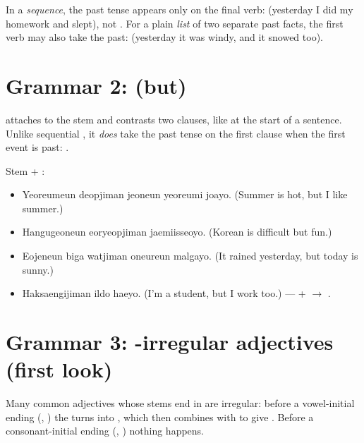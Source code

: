 \begin{important}
In a \emph{sequence}, the past tense appears only on the final verb:  (yesterday I did my homework and slept), not . For a plain
\emph{list} of two separate past facts, the first verb may also take the past:
 (yesterday it was windy, and it snowed too).
\end{important}

\section{Grammar 2:  (but)}

 attaches to the stem and contrasts two clauses, like  at the
start of a sentence. Unlike sequential , it \emph{does} take the past tense
on the first clause when the first event is past: .

\begin{example}[Contrast]
Stem + :
\begin{itemize}
  \item {} Yeoreumeun deopjiman jeoneun yeoreumi
        joayo. (Summer is hot, but I like summer.)
  \item {} Hangugeoneun eoryeopjiman jaemiisseoyo. (Korean
        is difficult but fun.)
  \item {} Eojeneun biga watjiman oneureun malgayo.
        (It rained yesterday, but today is sunny.)
  \item {} Haksaengijiman ildo haeyo. (I'm a student, but I
        work too.) ---  +  $\to$ .
\end{itemize}
\end{example}

\section{Grammar 3: -irregular adjectives (first look)}

Many common adjectives whose stems end in  are irregular: before a vowel-initial
ending (, ) the  turns into , which
then combines with  to give . Before a consonant-initial ending
(, ) nothing happens.

